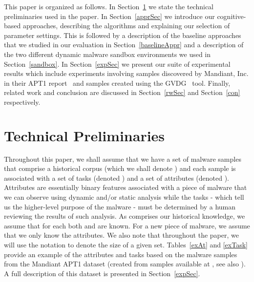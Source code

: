 \documentclass[conference]{IEEEtran}
\begin{document}
This paper is organized as follows. In Section~\ref{tp} we state the technical preliminaries used in the paper. In Section~\ref{apprSec} we introduce our cognitive-based approaches, describing the algorithms and explaining our selection of parameter settings.  This is followed by a description of the baseline approaches that we studied in our evaluation in Section~\ref{baselineAppr} and a description of the two different dynamic malware sandbox environments we used in Section~\ref{sandbox}.  In Section~\ref{expSec} we present our suite of experimental results which include experiments involving samples discovered by Mandiant, Inc. in their APT1 report~\cite{mandiant} and samples created using the GVDG~\cite{gvdg} tool.  Finally, related work and conclusion are discussed in Section~\ref{rwSec} and Section~\ref{con} respectively.

\section{Technical Preliminaries}
\label{tp}
Throughout this paper, we shall assume that we have a set of malware samples that comprise a historical corpus (which we shall denote ) and each sample  is associated with a set of tasks (denoted ) and a set of attributes (denoted ).  Attributes are essentially binary features associated with a piece of malware that we can observe using dynamic and/or static analysis while the tasks - which tell us the higher-level purpose of the malware - must be determined by a human reviewing the results of such analysis.  As  comprises our historical knowledge, we assume that for each  both  and  are known.  For a new piece of malware, we assume that we only know the attributes.  We also note that throughout the paper, we will use the notation  to denote the size of  a given set. Tables~\ref{exAt} and \ref{exTask} provide an example of the attributes and tasks based on the malware samples from the Mandiant APT1 dataset (created from samples available at \cite{apt1sams}, see also \cite{mandiant}).  A full description of this dataset is presented in Section~\ref{expSec}.
\end{document}
